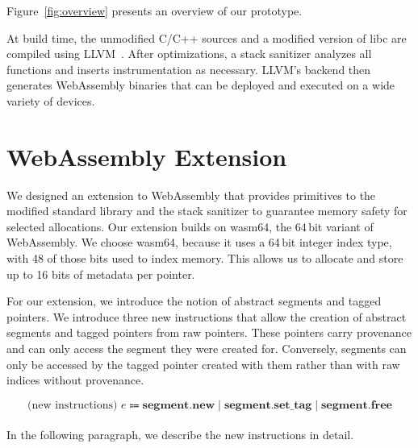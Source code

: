 Figure~\ref{fig:overview} presents an overview of our prototype.

At build time, the unmodified C/C++ sources and a modified version of libc are compiled using LLVM~\cite{lattner2004llvm}.
After optimizations, a stack sanitizer analyzes all functions and inserts instrumentation as necessary.
LLVM's backend then generates WebAssembly binaries that can be deployed and executed on a wide variety of devices.

\section{WebAssembly Extension}
\label{sec:wasm-extension}

We designed an extension to WebAssembly that provides primitives to the modified standard library and the stack sanitizer to guarantee memory safety for selected allocations.
Our extension builds on wasm64, the 64\,bit variant of WebAssembly.
We choose wasm64, because it uses a 64\,bit integer index type, with 48 of those bits used to index memory.
This allows us to allocate and store up to 16 bits of metadata per pointer.

For our extension, we introduce the notion of abstract segments and tagged pointers.
We introduce three new instructions that allow the creation of abstract segments and tagged pointers from raw pointers.
These pointers carry provenance and can only access the segment they were created for.
Conversely, segments can only be accessed by the tagged pointer created with them rather than with raw indices without provenance.

\begin{equation*}
    \text{(new instructions) } e \Coloneqq \textbf{segment.new} \mid \textbf{segment.set\_tag} \mid \textbf{segment.free}
\end{equation*}

\paragraph{}
In the following paragraph, we describe the new instructions in detail.

